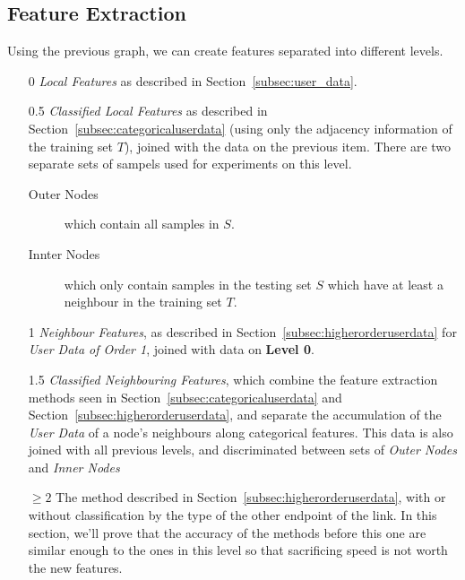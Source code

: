 \subsection{Feature Extraction}
\label{subsec:featureextraction}
Using the previous graph, we can create features separated into different levels.

\begin{enumerate}
	\item[0] \emph{Local Features} as described in Section~\ref{subsec:user_data}.
	\item[0.5] \emph{Classified Local Features} as described in Section~\ref{subsec:categoricaluserdata} (using only the adjacency information of the training set $T$), joined with the data on the previous item. There are two separate sets of sampels used for experiments on this level.
	\begin{description}
		\item[Outer Nodes] which contain all samples in $S$.
		\item[Innter Nodes] which only contain samples in the testing set $S$ which have at least a neighbour in the training set $T$.
	\end{description}
	\item[1] \emph{Neighbour Features}, as described in Section~\ref{subsec:higherorderuserdata} for \emph{User Data of Order 1}, joined with data on \textbf{Level 0}.
	\item[1.5] \emph{Classified Neighbouring Features}, which combine the feature extraction methods seen in Section~\ref{subsec:categoricaluserdata} and Section~\ref{subsec:higherorderuserdata}, and separate the accumulation of the \emph{User Data} of a node's neighbours along categorical features. This data is also joined with all previous levels, and discriminated between sets of \emph{Outer Nodes} and \emph{Inner Nodes}
	\item[$\geq 2$] The method described in Section~\ref{subsec:higherorderuserdata}, with or without classification by the type of the other endpoint of the link. In this section, we'll prove that the accuracy of the methods before this one are similar enough to the ones in this level so that sacrificing speed is not worth the new features.
\end{enumerate}

